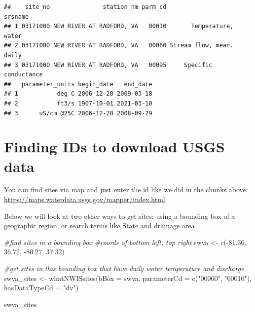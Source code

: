 \documentclass[
]{book}
\newenvironment{Shaded}{\begin{snugshade}}{\end{snugshade}}
\newcommand{\AttributeTok}[1]{\textcolor[rgb]{0.77,0.63,0.00}{#1}}
\newcommand{\CommentTok}[1]{\textcolor[rgb]{0.56,0.35,0.01}{\textit{#1}}}
\newcommand{\FloatTok}[1]{\textcolor[rgb]{0.00,0.00,0.81}{#1}}
\newcommand{\FunctionTok}[1]{\textcolor[rgb]{0.00,0.00,0.00}{#1}}
\newcommand{\NormalTok}[1]{#1}
\newcommand{\OtherTok}[1]{\textcolor[rgb]{0.56,0.35,0.01}{#1}}
\newcommand{\SpecialCharTok}[1]{\textcolor[rgb]{0.00,0.00,0.00}{#1}}
\newcommand{\StringTok}[1]{\textcolor[rgb]{0.31,0.60,0.02}{#1}}
\begin{document}
\begin{verbatim}
##    site_no               station_nm parm_cd                  srsname
## 1 03171000 NEW RIVER AT RADFORD, VA   00010       Temperature, water
## 2 03171000 NEW RIVER AT RADFORD, VA   00060 Stream flow, mean. daily
## 3 03171000 NEW RIVER AT RADFORD, VA   00095     Specific conductance
##   parameter_units begin_date   end_date
## 1           deg C 2006-12-20 2009-03-18
## 2           ft3/s 1907-10-01 2021-03-10
## 3      uS/cm @25C 2006-12-20 2008-09-29
\end{verbatim}

\hypertarget{finding-ids-to-download-usgs-data}{%
\section{Finding IDs to download USGS data}\label{finding-ids-to-download-usgs-data}}

You can find sites via map and just enter the id like we did in the chunks above: \url{https://maps.waterdata.usgs.gov/mapper/index.html}

Below we will look at two other ways to get sites: using a bounding box of a geographic region, or search terms like State and drainage area

\begin{Shaded}
\begin{Highlighting}[]
\CommentTok{\#find sites in a bounding box}
\CommentTok{\#coords of bottom left, top right}
\NormalTok{swva }\OtherTok{\textless{}{-}} \FunctionTok{c}\NormalTok{(}\SpecialCharTok{{-}}\FloatTok{81.36}\NormalTok{, }\FloatTok{36.72}\NormalTok{, }\SpecialCharTok{{-}}\FloatTok{80.27}\NormalTok{, }\FloatTok{37.32}\NormalTok{)}

\CommentTok{\#get sites in this bounding box that have daily water temperature and discharge}
\NormalTok{swva\_sites }\OtherTok{\textless{}{-}} \FunctionTok{whatNWISsites}\NormalTok{(}\AttributeTok{bBox =}\NormalTok{ swva, }
                            \AttributeTok{parameterCd =} \FunctionTok{c}\NormalTok{(}\StringTok{"00060"}\NormalTok{, }\StringTok{"00010"}\NormalTok{), }
                            \AttributeTok{hasDataTypeCd =} \StringTok{"dv"}\NormalTok{)}

\NormalTok{swva\_sites}
\end{Highlighting}
\end{Shaded}
\end{document}
